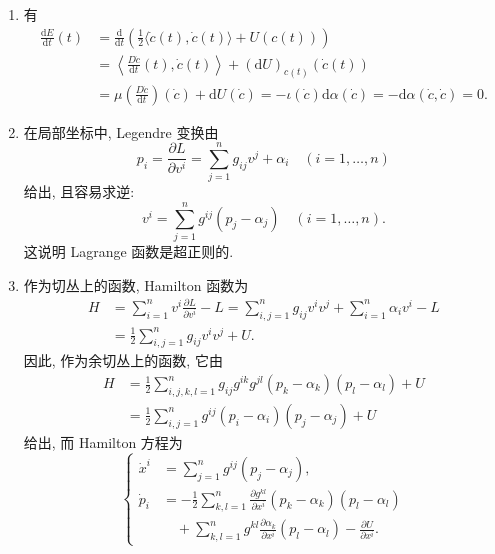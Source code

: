 \begin{description}[font=\normalfont,leftmargin=2em,labelwidth=1.5em]
\begin{enumerate}[label=(\alph*),ref=\alph*,leftmargin=*]
\begin{align*}
  &\qquad\left.-\frac{\partial(K+C)}{\partial x^i}(x(t),\dot{x}(t))
                   +\frac{\partial U}{\partial x^i}(x(t))\right]\mathrm{d}x^i=0\\
  &\iff\mu\left(\frac{D\dot c}{\mathrm{d}t}(t)\right)+\iota(\dot c(t))+\mathrm{d}\alpha(\mathrm{d}U)_{c(t)}=0,
\end{align*}
所求结论随即成立.
\item 有
\begin{align*}
  \frac{\mathrm{d}E}{\mathrm{d}t}(t)
  &=\frac{\mathrm{d}}{\mathrm{d}t}\left(\frac12\langle\dot c(t),\dot c(t)\rangle+U(c(t))\right)\\
  &=\left\langle\frac{D\dot c}{\mathrm{d}t}(t),\dot c(t)\right\rangle+(\mathrm{d}U)_{c(t)}(\dot c(t))\\
  &=\mu\left(\frac{D\dot c}{\mathrm{d}t}\right)(\dot c)+\mathrm{d}U(\dot c)
       =-\iota(\dot c)\mathrm{d}\alpha(\dot c)=-\mathrm{d}\alpha(\dot c,\dot c)=0.
\end{align*}
\item 在局部坐标中, Legendre 变换由
\[
  p_i=\frac{\partial L}{\partial v^i}=\sum_{j=1}^n g_{ij}v^j+\alpha_i
  \quad(i=1,\ldots,n)
\]
给出, 且容易求逆:
\[
  v^i=\sum_{j=1}^n g^{ij}(p_j-\alpha_j)\quad(i=1,\ldots,n).
\]
这说明 Lagrange 函数是超正则的.
\item 作为切丛上的函数, Hamilton 函数为
\begin{align*}
  H&=\sum_{i=1}^n v^i\frac{\partial L}{\partial v^i}-L
    =\sum_{i,j=1}^n g_{ij}v^iv^j+\sum_{i=1}^n\alpha_iv^i-L\\
    &=\frac12\sum_{i,j=1}^n g_{ij}v^iv^j+U.
\end{align*}
因此, 作为余切丛上的函数, 它由
\begin{align*}
  H&=\frac12\sum_{i,j,k,l=1}^n g_{ij}g^{ik}g^{jl}(p_k-\alpha_k)(p_l-\alpha_l)+U\\
   &=\frac12\sum_{i,j=1}^n g^{ij}(p_i-\alpha_i)(p_j-\alpha_j)+U
\end{align*}
给出, 而 Hamilton 方程为
\[
  \left\{\begin{aligned}
    \dot{x}^i
      &=\sum_{j=1}^n g^{ij}(p_j-\alpha_j),\\
    \dot p_i&=-\frac12\sum_{k,l=1}^n\frac{\partial g^{kl}}{\partial x^i}
          (p_k-\alpha_k)(p_l-\alpha_l)\\
      &\quad+\sum_{k,l=1}^n g^{kl}\frac{\partial\alpha_k}{\partial x^i}(p_l-\alpha_l)
           -\frac{\partial U}{\partial x^i}.
  \end{aligned}\right.
\]
\end{enumerate}


\end{description}
